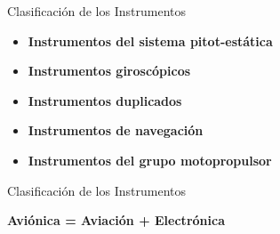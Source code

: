 

\begin{frame}{Clasificaci\'on de los Instrumentos}

  \begin{itemize}
  \item {\bf Instrumentos del sistema pitot-est\'atica}
  \item {\bf Instrumentos girosc\'opicos}
  \item {\bf Instrumentos duplicados}
  \item {\bf Instrumentos de navegaci\'on}
  \item {\bf Instrumentos del grupo motopropulsor}
  \end{itemize}

\end{frame}





\begin{frame}{Clasificaci\'on de los Instrumentos}

{\Large \bf Avi\'onica = Aviaci\'on + Electr\'onica}

\end{frame}
